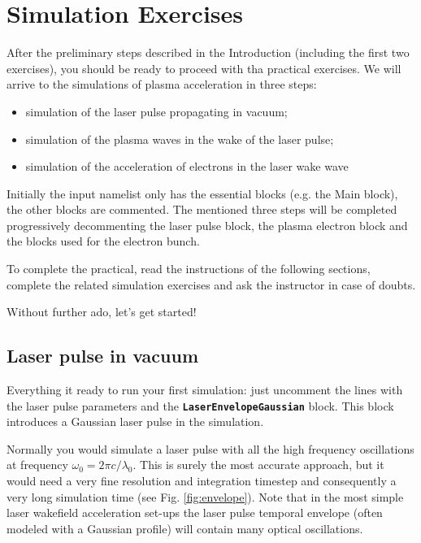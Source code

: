 \documentclass[a4paper,12pt]{extarticle}
\newcommand{\commandline}[1]{\texttt{\textbf{#1}}}
\begin{document}
\section{Simulation Exercises}
After the preliminary steps described in the Introduction (including the first two exercises), you should be ready to proceed with tha practical exercises.  We will arrive to the simulations of plasma acceleration in three steps:
\begin{itemize}
\item simulation of the laser pulse propagating in vacuum;
\item simulation of the plasma waves in the wake of the laser pulse;
\item simulation of the acceleration of electrons in the laser wake wave
\end{itemize}

Initially the input namelist only has the essential blocks (e.g.  the Main block),  the other blocks are commented. The mentioned three steps will be completed progressively decommenting the laser pulse block, the plasma electron block and the blocks used for the electron bunch.

To complete the practical, read the instructions of the following sections, complete the related simulation exercises and ask the instructor in case of doubts. 

Without further ado, let's get started!

\subsection{Laser pulse in vacuum}
Everything it ready to run your first simulation: just uncomment the lines with the laser pulse parameters and the \commandline{LaserEnvelopeGaussian} block. This block introduces a Gaussian laser pulse in the simulation.

Normally you would simulate a laser pulse with all the high frequency oscillations at frequency $\omega_0=2\pi c/\lambda_0$. This is surely the most accurate approach, but it would need a very fine resolution and integration timestep and consequently a very long simulation time (see Fig. \ref{fig:envelope}). Note that in the most simple laser wakefield acceleration set-ups the laser pulse temporal envelope (often modeled with a Gaussian profile) will contain many optical oscillations.
\end{document}
